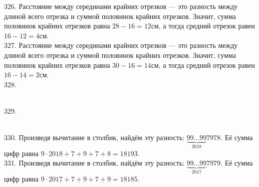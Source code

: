 \documentclass[12pt]{article}
\begin{document}
326. Расстояние между серединами крайних отрезков --- это разность между длиной всего отрезка и суммой половинок крайних отрезков. Значит, сумма половинок крайних отрезков равна $28-16=12$см, а тогда средний отрезок равен $16-12=4$см.\\
327. Расстояние между серединами крайних отрезков --- это разность между длиной всего отрезка и суммой половинок крайних отрезков. Значит, сумма половинок крайних отрезков равна $30-16=14$см, а тогда средний отрезок равен $16-14=2$см.\\
328. \begin{figure}[ht!]
\end{figure}\\
329. \begin{figure}[ht!]
\end{figure}\\
330. Произведя вычитание в столбик, найдём эту разность: $\underbrace{99\ldots99}_{2018}7978.$ Её сумма цифр равна $9\cdot2018+7+9+7+8=18193.$\\
331. Произведя вычитание в столбик, найдём эту разность: $\underbrace{99\ldots99}_{2017}7979.$ Её сумма цифр равна $9\cdot2017+7+9+7+9=18185.$\\
\end{document}
